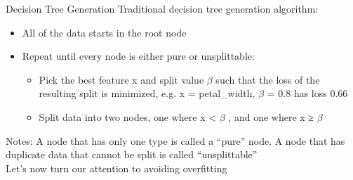 \documentclass[aspectratio=169]{../latex_main/tntbeamer}  %
\begin{document}
	
	\begin{frame}{Decision Tree Generation}
	    Traditional decision tree generation algorithm: 
	    \begin{itemize}
	        \item All of the data starts in the root node
	        \item Repeat until every node is either pure or unsplittable:
	        \begin{itemize}
	            \item Pick the best feature x and split value $\beta$ such that the loss of the resulting split is minimized, e.g. x = petal\_width, $\beta$ = 0.8 has loss 0.66
	            \item Split data into two nodes, one where x < $\beta$ , and one where x ≥ $\beta$ 
	        \end{itemize}
	    \end{itemize}
	    Notes: A node that has only one type is called a “pure” node. A node that has duplicate data that cannot be split is called “unsplittable” \\
	    \bigskip
        Let’s now turn our attention to avoiding overfitting

	\end{frame}
\end{document}
